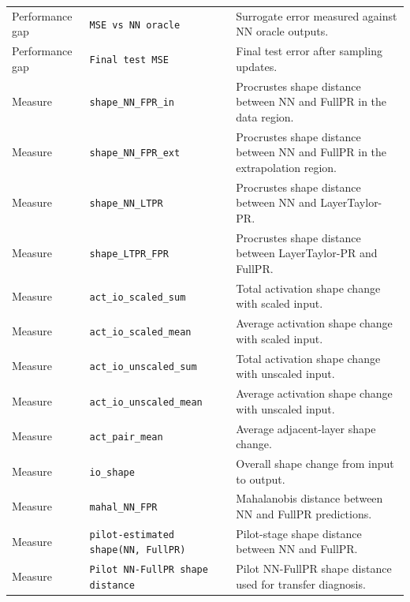 \documentclass[]{interact}
\theoremstyle{plain}
\theoremstyle{definition}
\theoremstyle{remark}
\begin{document}
\begin{longtable}{p{}p{}p{}}
Performance gap
& \texttt{MSE vs NN oracle}
& Surrogate error measured against NN oracle outputs. \\

Performance gap
& \texttt{Final test MSE}
& Final test error after sampling updates. \\

\midrule

Measure
& \texttt{shape\_NN\_FPR\_in}
& Procrustes shape distance between NN and FullPR in the data region. \\

Measure
& \texttt{shape\_NN\_FPR\_ext}
& Procrustes shape distance between NN and FullPR in the extrapolation region. \\

Measure
& \texttt{shape\_NN\_LTPR}
& Procrustes shape distance between NN and LayerTaylor-PR. \\

Measure
& \texttt{shape\_LTPR\_FPR}
& Procrustes shape distance between LayerTaylor-PR and FullPR. \\

Measure
& \texttt{act\_io\_scaled\_sum}
& Total activation shape change with scaled input. \\

Measure
& \texttt{act\_io\_scaled\_mean}
& Average activation shape change with scaled input. \\

Measure
& \texttt{act\_io\_unscaled\_sum}
& Total activation shape change with unscaled input. \\

Measure
& \texttt{act\_io\_unscaled\_mean}
& Average activation shape change with unscaled input. \\

Measure
& \texttt{act\_pair\_mean}
& Average adjacent-layer shape change. \\

Measure
& \texttt{io\_shape}
& Overall shape change from input to output. \\

Measure
& \texttt{mahal\_NN\_FPR}
& Mahalanobis distance between NN and FullPR predictions. \\

Measure
& \texttt{pilot-estimated shape(NN, FullPR)}
& Pilot-stage shape distance between NN and FullPR. \\

Measure
& \texttt{Pilot NN-FullPR shape distance}
& Pilot NN-FullPR shape distance used for transfer diagnosis. \\


\end{longtable}
\end{document}
